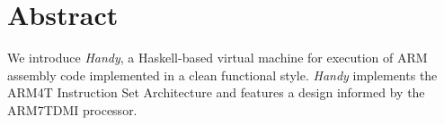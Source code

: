 

\begingroup
\let\clearpage\relax
\let\cleardoublepage\relax
\let\cleardoublepage\relax

\chapter*{Abstract} %

We introduce \emph{Handy}, a Haskell-based virtual machine for execution of ARM assembly code implemented in a clean functional style. \emph{Handy} implements the ARM4T Instruction Set Architecture and features a design informed by the ARM7TDMI processor.

\endgroup

\vfill
